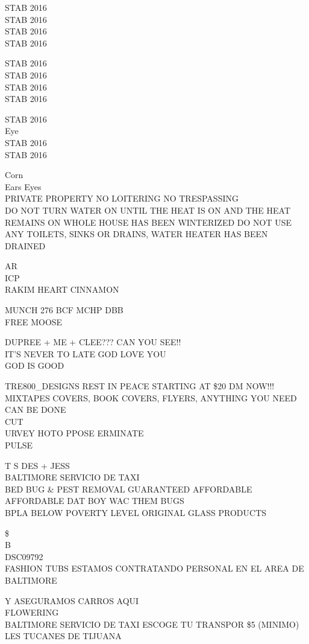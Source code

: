 \documentclass[10pt,letterpaper]{article}
\begin{document}
STAB 2016\\
STAB 2016\\
STAB 2016\\
STAB 2016

STAB 2016\\
STAB 2016\\
STAB 2016\\
STAB 2016

STAB 2016\\
Eye\\
STAB 2016\\
STAB 2016

Corn\\
Ears Eyes\\
PRIVATE PROPERTY NO LOITERING NO TRESPASSING\\
DO NOT TURN WATER ON UNTIL THE HEAT IS ON AND THE HEAT REMAINS ON WHOLE HOUSE HAS BEEN WINTERIZED DO NOT USE ANY TOILETS, SINKS OR DRAINS, WATER HEATER HAS BEEN DRAINED

AR\\
ICP\\
RAKIM HEART CINNAMON

MUNCH 276 BCF MCHP DBB\\
FREE MOOSE

DUPREE + ME + CLEE??? CAN YOU SEE!!\\
IT'S NEVER TO LATE GOD LOVE YOU\\
GOD IS GOOD

TRE800\_DESIGNS REST IN PEACE STARTING AT \$20 DM NOW!!! MIXTAPES COVERS, BOOK COVERS, FLYERS, ANYTHING YOU NEED CAN BE DONE\\
CUT\\
URVEY HOTO PPOSE ERMINATE\\
PULSE

T S DES + JESS\\
BALTIMORE SERVICIO DE TAXI\\
BED BUG \& PEST REMOVAL GUARANTEED AFFORDABLE AFFORDABLE DAT BOY WAC THEM BUGS\\
BPLA BELOW POVERTY LEVEL ORIGINAL GLASS PRODUCTS

\$\\
B\\
DSC09792\\
FASHION TUBS ESTAMOS CONTRATANDO PERSONAL EN EL AREA DE BALTIMORE

Y ASEGURAMOS CARROS AQUI\\
FLOWERING\\
BALTIMORE SERVICIO DE TAXI ESCOGE TU TRANSPOR \$5 (MINIMO)\\
LES TUCANES DE TIJUANA
\end{document}
